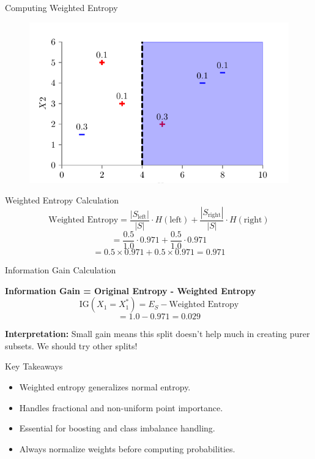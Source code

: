 \documentclass[usenames,dvipsnames]{beamer}
\begin{document}
\begin{frame}{Computing Weighted Entropy}
\begin{figure}
    \centering
    \includegraphics[scale=0.7]{../assets/decision-trees/figures/dt_weighted/fig5.pdf}
\end{figure}
\scriptsize
\begin{examplebox}{Weighted Entropy Calculation}
$$\text{Weighted Entropy} = \frac{|S_{\text{left}}|}{|S|} \cdot H(\text{left}) + \frac{|S_{\text{right}}|}{|S|} \cdot H(\text{right})$$
$$= \frac{0.5}{1.0} \cdot 0.971 + \frac{0.5}{1.0} \cdot 0.971$$
$$= 0.5 \times 0.971 + 0.5 \times 0.971 = 0.971$$
\end{examplebox}
\end{frame}

\begin{frame}{Information Gain Calculation}
    \scriptsize
\begin{keypointsbox}
    
\textbf{Information Gain = Original Entropy - Weighted Entropy}
$$\text{IG}(X_1 = X_1^*) = E_S - \text{Weighted Entropy}$$
$$= 1.0 - 0.971 = 0.029$$
\end{keypointsbox}

\textbf{Interpretation:} Small gain means this split doesn't help much in creating purer subsets. We should try other splits!
\end{frame}








\begin{frame}{Key Takeaways}
\begin{itemize}[<+->]
\item Weighted entropy generalizes normal entropy.
\item Handles fractional and non-uniform point importance.
\item Essential for boosting and class imbalance handling.
\item Always normalize weights before computing probabilities.
\end{itemize}
\end{frame}
\end{document}
